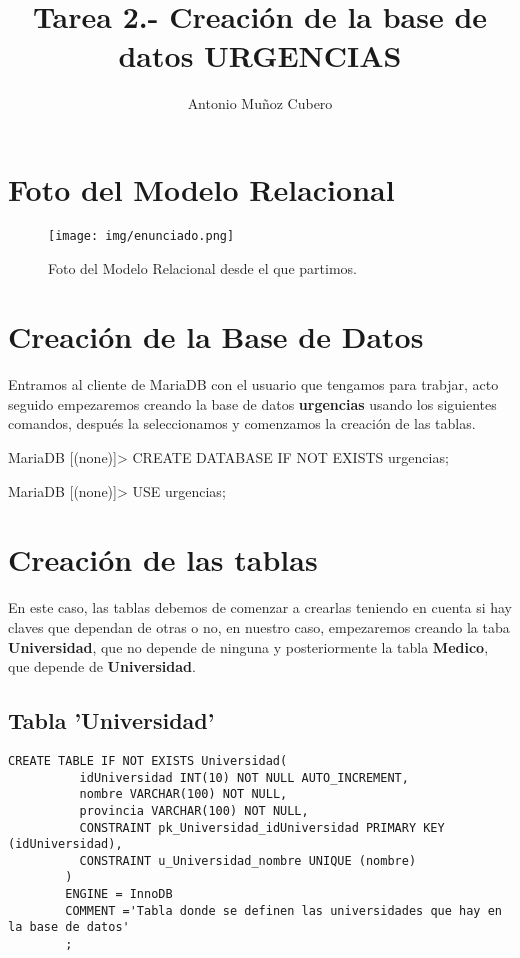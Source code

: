 \documentclass{article}
\title{Tarea 2.- Creación de la base de datos \textbf{URGENCIAS}}
\author{Antonio Muñoz Cubero}
\begin{document}
  \maketitle
      \pagestyle{fancy} 

\newpage
  \tableofcontents

\newpage
  \section{Foto del Modelo Relacional}
    \begin{figure}[h]
      \centering
      \texttt{[image: img/enunciado.png]}
      \caption{Foto del Modelo Relacional desde el que partimos.}
    \end{figure}

\newpage
  \section{Creación de la Base de Datos}
    Entramos al cliente de MariaDB con el usuario que tengamos para trabjar, acto seguido empezaremos creando 
    la base de datos \textbf{urgencias} usando los siguientes comandos, después la seleccionamos y comenzamos la creación de las tablas. 
    \begin{listing}[style=consola, numbers=none]
    MariaDB [(none)]> CREATE DATABASE IF NOT EXISTS urgencias;

    MariaDB [(none)]> USE urgencias;

    \end{listing}

  \section{Creación de las tablas}
    En este caso, las tablas debemos de comenzar a crearlas teniendo en cuenta si hay claves que dependan de otras o no, en nuestro caso, empezaremos creando 
    la taba \textbf{Universidad}, que no depende de ninguna y posteriormente la tabla \textbf{Medico}, que depende de \textbf{Universidad}.
    \subsection{Tabla 'Universidad'}
      \begin{lstlisting}[style=C]
        CREATE TABLE IF NOT EXISTS Universidad(
          idUniversidad INT(10) NOT NULL AUTO_INCREMENT,
          nombre VARCHAR(100) NOT NULL,
          provincia VARCHAR(100) NOT NULL,
          CONSTRAINT pk_Universidad_idUniversidad PRIMARY KEY (idUniversidad),
          CONSTRAINT u_Universidad_nombre UNIQUE (nombre)
        )
        ENGINE = InnoDB
        COMMENT ='Tabla donde se definen las universidades que hay en la base de datos'
        ;
      \end{lstlisting}
\end{document}
